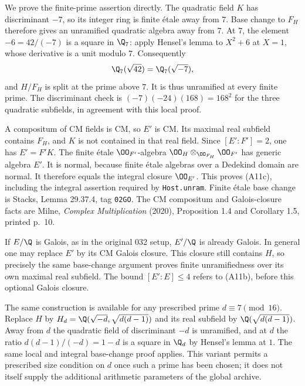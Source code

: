 We prove the finite-prime assertion directly.  The quadratic field
$K$ has discriminant $-7$, so its integer ring is finite
\'etale away from $7$.  Base change to $F_H$ therefore gives
an unramified quadratic algebra away from $7$.  At $7$, the element
$-6=42/(-7)$ is a square in $\Q_7$: apply Hensel's lemma to
$X^2+6$ at $X=1$, whose derivative is a unit modulo $7$.
Consequently
\[
 \Q_7(\sqrt{42})=\Q_7(\sqrt{-7}),
\]
and $H/F_H$ is split at the prime above $7$.  It is thus unramified
at every finite prime.  The discriminant check is
$(-7)(-24)(168)=168^2$ for the three quadratic subfields, in
agreement with this local proof.

A compositum of CM fields is CM, so $E'$ is CM.  Its maximal real
subfield contains $F_H$, and $K$ is not contained in that real
field.  Since $[E':F']=2$, one has $E'=F'K$.  The finite
\'etale $\OO_{F'}$-algebra
$\OO_H\otimes_{\OO_{F_H}}\OO_{F'}$ has generic algebra $E'$.
It is normal, because finite \'etale algebras over a Dedekind
domain are normal.  It therefore equals the integral closure
$\OO_{E'}$.  This proves (A11c), including the integral assertion
required by \texttt{Host.unram}.  Finite \'etale base change
is Stacks, Lemma 29.37.4, tag \texttt{02GO}.  The CM compositum
and Galois-closure facts are Milne, \emph{Complex Multiplication}
(2020), Proposition 1.4 and Corollary 1.5, printed p.~10.

If $E/\Q$ is Galois, as in the original 032 setup, $E'/\Q$ is
already Galois.  In general one may replace $E'$ by its CM Galois
closure.  This closure still contains $H$, so precisely the same
base-change argument proves finite unramifiedness over its own
maximal real subfield.  The bound $[E':E]\leq4$ refers to (A11b),
before this optional Galois closure.

The same construction is available for any prescribed prime
$d\equiv7\pmod {16}$.  Replace $H$ by
$H_d=\Q(\sqrt{-d},\sqrt{d(d-1)})$ and its real subfield by
$\Q(\sqrt{d(d-1)})$.  Away from $d$ the quadratic field of
discriminant $-d$ is unramified, and at $d$ the ratio
$d(d-1)/(-d)=1-d$ is a square in $\Q_d$ by Hensel's lemma
at $1$.  The same local and integral base-change proof applies.
This variant permits a prescribed size condition on $d$
once such a prime has been chosen; it does not itself supply
the additional arithmetic parameters of the global archive.

